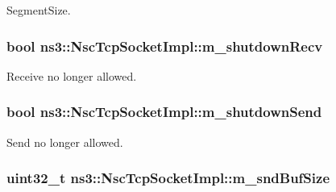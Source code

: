 Segment\+Size. 

\subsubsection[{\texorpdfstring{m\+\_\+shutdown\+Recv}{m_shutdownRecv}}]{\setlength{\rightskip}{0pt plus 5cm}bool ns3\+::\+Nsc\+Tcp\+Socket\+Impl\+::m\+\_\+shutdown\+Recv\hspace{0.3cm}{\ttfamily [private]}}\hypertarget{classns3_1_1NscTcpSocketImpl_acc152ea66a20478c1f222a4f0862e026}{}\label{classns3_1_1NscTcpSocketImpl_acc152ea66a20478c1f222a4f0862e026}


Receive no longer allowed. 

\subsubsection[{\texorpdfstring{m\+\_\+shutdown\+Send}{m_shutdownSend}}]{\setlength{\rightskip}{0pt plus 5cm}bool ns3\+::\+Nsc\+Tcp\+Socket\+Impl\+::m\+\_\+shutdown\+Send\hspace{0.3cm}{\ttfamily [private]}}\hypertarget{classns3_1_1NscTcpSocketImpl_a1de235841a1bb10b91b7238bb77ce45f}{}\label{classns3_1_1NscTcpSocketImpl_a1de235841a1bb10b91b7238bb77ce45f}


Send no longer allowed. 

\subsubsection[{\texorpdfstring{m\+\_\+snd\+Buf\+Size}{m_sndBufSize}}]{\setlength{\rightskip}{0pt plus 5cm}uint32\+\_\+t ns3\+::\+Nsc\+Tcp\+Socket\+Impl\+::m\+\_\+snd\+Buf\+Size\hspace{0.3cm}{\ttfamily [private]}}\hypertarget{classns3_1_1NscTcpSocketImpl_a03ad612a2135edbbeb20a683857b569a}{}\label{classns3_1_1NscTcpSocketImpl_a03ad612a2135edbbeb20a683857b569a}


